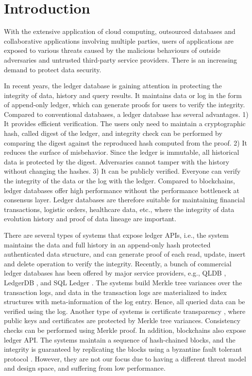 \documentclass[11pt,dvipdfm]{article}
\begin{document}
\section{Introduction}

With the extensive application of cloud computing, outsourced databases and collaborative applications involving multiple parties, users of applications are exposed to various threats caused by the malicious behaviours of outside adversaries and untrusted third-party service providers. There is an increasing demand to protect data security.

In recent years, the ledger database is gaining attention in protecting the integrity of data, history and query results. 
It maintains data or log in the form of append-only ledger, which can generate proofs for users to verify the integrity. Compared to conventional databases, a ledger database has several advantages. 1) It provides efficient verification. The users only need to maintain a cryptographic hash, called digest of the ledger, and integrity check can be performed by comparing the digest against the reproduced hash computed from the proof. 2) It reduces the surface of misbehavior. Since the ledger is immutable, all historical data is protected by the digest. Adversaries cannot tamper with the history without changing the hashes. 3) It can be publicly verified. Everyone can verify the integrity of the data or the log with the ledger. Compared to blockchains, ledger databases offer high performance without the performance bottleneck at consensus layer. Ledger databases are therefore suitable for maintaining financial transactions, logistic orders, healthcare data, etc., where the integrity of data evolution history and proof of data lineage are important.

There are several types of systems that expose ledger APIs, i.e., the system maintains the data and full history in an append-only hash protected authenticated data structure, and can generate proof of each read, update, insert and delete operation to verify the integrity. 
Recently, a bunch of commercial ledger databases has been offered by major service providers, e.g., QLDB \cite{qldb}, LedgerDB \cite{ledgerdb}, and SQL Ledger \cite{sqlledger}. The systems build Merkle tree variances over the transaction logs, and data in the transaction logs are materialized to index structures with meta-information of the log entry. Hence, all queried data can be verified using the log.
Another type of systems is certificate transparency \cite{ct, coniks, merkle2, ect}, where public keys and certificates are protected by Merkle tree variances. Consistency checks can be performed using Merkle proof. 
In addition, blockchains \cite{hyperledger, ethereum, quorum} also expose ledger API. The systems maintain a sequence of hash-chained blocks, and the integrity is guaranteed by replicating the blocks using a byzantine fault tolerant protocol \cite{pbft}. However, they are not our focus due to having a different threat model and design space, and suffering from low performance.
\end{document}

